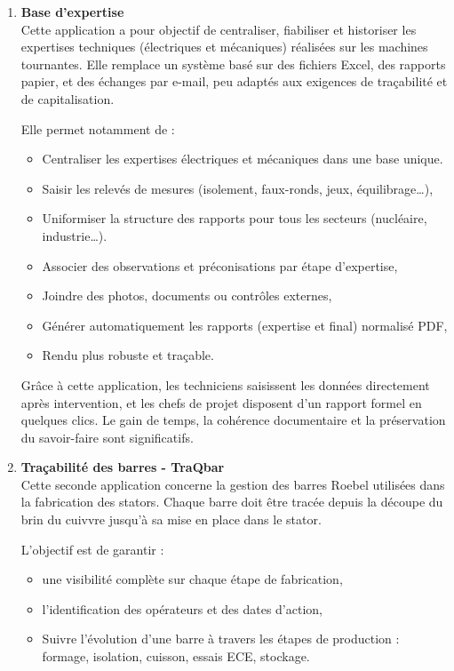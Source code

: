 \documentclass[11pt,a4paper]{article}
\begin{document}
\begin{enumerate}
    \item \textbf{Base d’expertise}
    \\
    Cette application a pour objectif de centraliser, fiabiliser et historiser les expertises techniques (électriques et mécaniques) réalisées sur les machines tournantes. Elle remplace un système basé sur des fichiers Excel, des rapports papier, et des échanges par e-mail, peu adaptés aux exigences de traçabilité et de capitalisation.

Elle permet notamment de :
\begin{itemize}
    \item Centraliser les expertises électriques et mécaniques dans une base unique.
    \item Saisir les relevés de mesures (isolement, faux-ronds, jeux, équilibrage…),
        \item Uniformiser la structure des rapports pour tous les secteurs (nucléaire, industrie…).

    \item Associer des observations et préconisations par étape d’expertise,
    \item Joindre des photos, documents ou contrôles externes,
    \item Générer automatiquement les rapports (expertise et final) normalisé PDF,
    \item Rendu plus robuste et traçable.
\end{itemize}
Grâce à cette application, les techniciens saisissent les données directement après intervention, et les chefs de projet disposent d’un rapport formel en quelques clics. Le gain de temps, la cohérence documentaire et la préservation du savoir-faire sont significatifs.

    \item \textbf{Traçabilité des barres - TraQbar}
    \\
    Cette seconde application concerne la gestion des barres Roebel utilisées dans la fabrication des stators. Chaque barre doit être tracée depuis la découpe du brin du cuivvre jusqu’à sa mise en place dans le stator.
    
L’objectif est de garantir :
\begin{itemize}
    \item une visibilité complète sur chaque étape de fabrication,
    \item l’identification des opérateurs et des dates d’action,
        \item Suivre l'évolution d'une barre à travers les étapes de production : formage, isolation, cuisson, essais ECE, stockage.


\end{itemize}
\end{enumerate}
\end{document}
